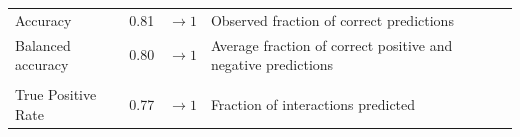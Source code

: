\documentclass[11pt]{article}
\begin{document}
\begin{longtable}[]{@{}llll@{}}
\begin{minipage}[t]{0.21\columnwidth}
Accuracy\strut
\end{minipage} & \begin{minipage}[t]{0.05\columnwidth}\raggedright
0.81\strut
\end{minipage} & \begin{minipage}[t]{0.13\columnwidth}\raggedright
\(\rightarrow 1\)\strut
\end{minipage} & \begin{minipage}[t]{0.49\columnwidth}\raggedright
Observed fraction of correct predictions\strut
\end{minipage}\tabularnewline
\begin{minipage}[t]{0.21\columnwidth}\raggedright
Balanced accuracy\strut
\end{minipage} & \begin{minipage}[t]{0.05\columnwidth}\raggedright
0.80\strut
\end{minipage} & \begin{minipage}[t]{0.13\columnwidth}\raggedright
\(\rightarrow 1\)\strut
\end{minipage} & \begin{minipage}[t]{0.49\columnwidth}\raggedright
Average fraction of correct positive and negative predictions\strut
\end{minipage}\tabularnewline
\begin{minipage}[t]{0.21\columnwidth}\raggedright
\strut
\end{minipage} & \begin{minipage}[t]{0.05\columnwidth}\raggedright
\strut
\end{minipage} & \begin{minipage}[t]{0.13\columnwidth}\raggedright
\strut
\end{minipage} & \begin{minipage}[t]{0.49\columnwidth}\raggedright
\strut
\end{minipage}\tabularnewline
\begin{minipage}[t]{0.21\columnwidth}\raggedright
True Positive Rate\strut
\end{minipage} & \begin{minipage}[t]{0.05\columnwidth}\raggedright
0.77\strut
\end{minipage} & \begin{minipage}[t]{0.13\columnwidth}\raggedright
\(\rightarrow 1\)\strut
\end{minipage} & \begin{minipage}[t]{0.49\columnwidth}\raggedright
Fraction of interactions predicted\strut
\end{minipage}\tabularnewline

\end{longtable}
\end{document}
